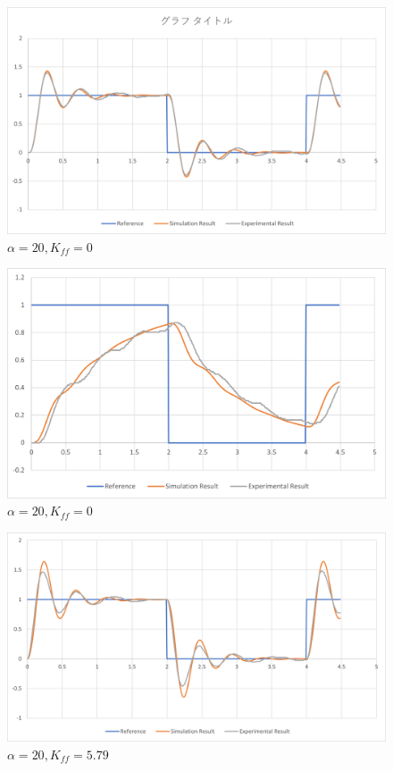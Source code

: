 \documentclass[xelatex,ja=standard,jafont=noto]{bxjsarticle}
\numberwithin{figure}{section}
\begin{document}
\begin{figure}[h!]
    \centering
    \includegraphics[scale=0.6]{020.png}
    \caption{$\alpha=20,K_{ff}=0$}
\end{figure}

\newpage

\begin{figure}[h!]
    \centering
    \includegraphics[scale=0.7]{021.png}
    \caption{$\alpha=20,K_{ff}=0$}
\end{figure}

\begin{figure}[h!]
    \centering
    \includegraphics[scale=0.6]{022.png}
    \caption{$\alpha=20,K_{ff}=5.79$}
\end{figure}
\end{document}
